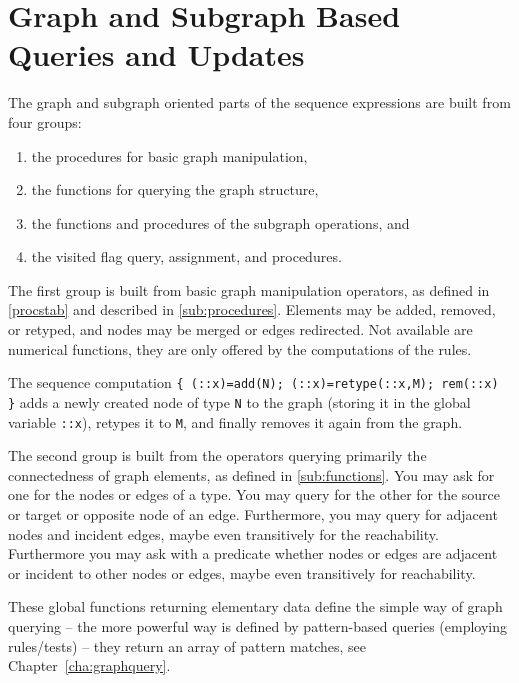 \section{Graph and Subgraph Based Queries and Updates}\label{sec:queryupdate}\label{sec:visited}

The graph and subgraph oriented parts of the sequence expressions are built from four groups:
\begin{enumerate}
	\item the procedures for basic graph manipulation,
	\item the functions for querying the graph structure,
	\item the functions and procedures of the subgraph operations, and
	\item the visited flag query, assignment, and procedures.
\end{enumerate}

The first group is built from basic graph manipulation operators, as defined in \ref{procstab} and described in \ref{sub:procedures}.
Elements may be added, removed, or retyped, and nodes may be merged or edges redirected.
Not available are numerical functions, they are only offered by the computations of the rules. 

\begin{example}
The sequence computation \verb#{ (::x)=add(N); (::x)=retype(::x,M); rem(::x) }# adds a newly created node of type \texttt{N} to the graph (storing it in the global variable \verb#::x#), retypes it to \texttt{M}, and finally removes it again from the graph.
\end{example}

The second group is built from the operators querying primarily the connectedness of graph elements,
as defined in \ref{sub:functions}.
You may ask for one for the nodes or edges of a type.
You may query for the other for the source or target or opposite node of an edge.
Furthermore, you may query for adjacent nodes and incident edges,
maybe even transitively for the reachability.
Furthermore you may ask with a predicate whether nodes or edges are adjacent or incident to other nodes or edges, maybe even transitively for reachability.

These global functions returning elementary data define the simple way of graph querying -- the more powerful way is defined by pattern-based queries (employing rules/tests) -- they return an array of pattern matches, see Chapter~\ref{cha:graphquery}.

